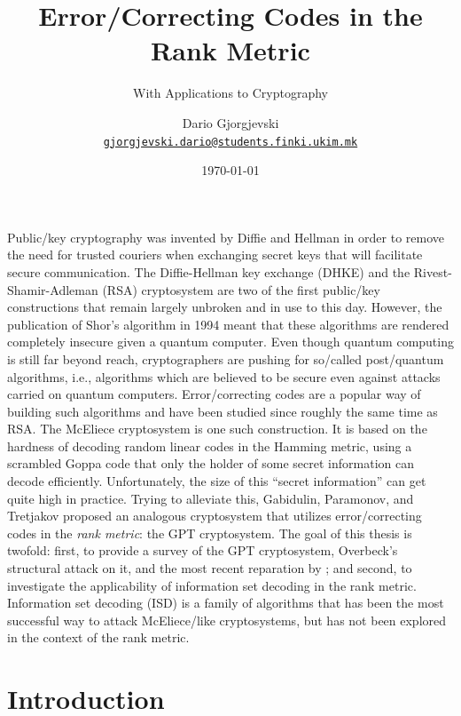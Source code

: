 \documentclass[version=last, paper=A4, parskip=half, oneside]{scrbook}
\title{Error\-/Correcting Codes in the Rank Metric}
\subtitle{With Applications to Cryptography}
\author{%
  Dario Gjorgjevski\\%
  \href{mailto:gjorgjevski.dario@students.finki.ukim.mk}{\nolinkurl{gjorgjevski.dario@students.finki.ukim.mk}}}
\date{\today}
\theoremstyle{plain}
\theoremstyle{definition}
\theoremstyle{remark}
\begin{document}

\newcommand*{\listofloaname}{\listalgorithmcfname}
\renewcommand{\listofalgorithms}{\listoftoc{loa}}

\frontmatter%
\maketitle%
\tableofcontents%
\listoffigures%
\listoftables%
\listofalgorithms%
\listoflistings%


Public\-/key cryptography was invented by Diffie and Hellman in order to remove
the need for trusted couriers when exchanging secret keys that will facilitate
secure communication.  The Diffie\--Hellman key exchange (DHKE) and the
Rivest\--Shamir\--Adleman (RSA) cryptosystem are two of the first public\-/key
constructions that remain largely unbroken and in use to this day.  However, the
publication of Shor's algorithm in 1994 meant that these algorithms are rendered
completely insecure given a quantum computer.  Even though quantum computing is
still far beyond reach, cryptographers are pushing for so\-/called
post\-/quantum algorithms, i.e., algorithms which are believed to be secure even
against attacks carried on quantum computers.  Error\-/correcting codes are a
popular way of building such algorithms and have been studied since roughly the
same time as RSA\@.  The McEliece cryptosystem is one such construction.  It is
based on the hardness of decoding random linear codes in the Hamming metric,
using a scrambled Goppa code that only the holder of some secret information can
decode efficiently.  Unfortunately, the size of this \enquote{secret
  information} can get quite high in practice.  Trying to alleviate this,
Gabidulin, Paramonov, and Tretjakov proposed an analogous cryptosystem that
utilizes error\-/correcting codes in the \emph{rank metric}: the GPT
cryptosystem.  The goal of this thesis is twofold: first, to provide a survey of
the GPT cryptosystem, Overbeck's structural attack on it, and the most recent
reparation by \textcite{Loi17}; and second, to investigate the applicability of
information set decoding in the rank metric.  Information set decoding (ISD) is
a family of algorithms that has been the most successful way to attack
McEliece\-/like cryptosystems, but has not been explored in the context of the
rank metric.

\mainmatter%
\chapter{Introduction}\label{chap:introduction}
\end{document}
